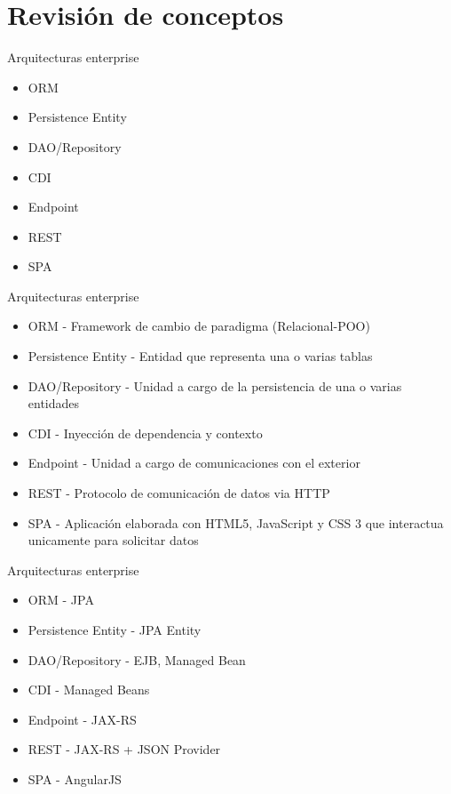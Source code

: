 \documentclass{beamer}
\begin{document}
\section{Revisión de conceptos}

\begin{frame}{Arquitecturas enterprise}
\begin{itemize}
	\item ORM
	\item Persistence Entity
	\item DAO/Repository
	\item CDI
	\item Endpoint
	\item REST
	\item SPA
\end{itemize}
\end{frame}


\begin{frame}{Arquitecturas enterprise}
\begin{itemize}
	\item ORM - Framework de cambio de paradigma (Relacional-POO)
	\item Persistence Entity - Entidad que representa una o varias tablas
	\item DAO/Repository - Unidad a cargo de la persistencia de una o varias entidades
	\item CDI - Inyección de dependencia y contexto
	\item Endpoint - Unidad a cargo de comunicaciones con el exterior
	\item REST - Protocolo de comunicación de datos via HTTP
	\item SPA - Aplicación elaborada con HTML5, JavaScript y CSS 3 que interactua unicamente para solicitar datos
\end{itemize}
\end{frame}

\begin{frame}{Arquitecturas enterprise}
\begin{itemize}
	\item ORM - JPA
	\item Persistence Entity - JPA Entity
	\item DAO/Repository - EJB, Managed Bean
	\item CDI - Managed Beans
	\item Endpoint - JAX-RS
	\item REST - JAX-RS + JSON Provider
	\item SPA - AngularJS
\end{itemize}
\end{frame}
\end{document}
